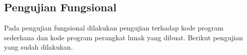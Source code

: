 \subsection{Pengujian Fungsional}
\label{sec:pengujian fungsional}
Pada pengujian fungsional dilakukan pengujian terhadap kode program sederhana dan kode program perangkat lunak yang dibuat. Berikut pengujian yang sudah dilakukan.%
